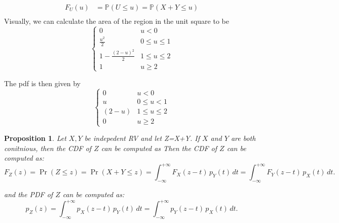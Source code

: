 \documentclass[twoside]{article}
\newtheorem{proposition}[theorem]{Proposition}
\newcommand{\prob}{\mathbb{P}}
\begin{document}
\begin{itemize}
\begin{center}
{%
}%
\end{center}

\begin{align*}
    F_U(u) &= \prob(U\leq u)= \prob(X+Y\leq u)\\
\end{align*}
Visually, we can calculate the area of the region in the unit square to be 
\[
\begin{cases}
    0 & u<0\\
    \frac{u^2}{2} & 0\leq u \leq 1\\
    1-\frac{(2-u)^2}{2} & 1\leq u \leq 2\\
    1 & u\geq 2
\end{cases}
\]

The pdf is then given by
\[
\begin{cases}
    0 & u<0\\
    u & 0\leq u < 1\\
    (2-u) & 1\leq u \leq 2\\
    0 & u\geq 2
\end{cases}
\]
\begin{proposition}
Let $X,Y$ be indepedent RV and let Z=X+Y. If $X$ and $Y$ are both conitnious, then the CDF of $Z$ can be computed as 
Then the CDF of $Z$ can be computed as:
\[
F_Z(z)=\Pr(Z\le z)=\Pr(X+Y\le z)
= \int_{-\infty}^{+\infty} F_X(z-t)\,p_Y(t)\,dt
= \int_{-\infty}^{+\infty} F_Y(z-t)\,p_X(t)\,dt .
\]

and the PDF of $Z$ can be computed as:
\[
p_Z(z)=\int_{-\infty}^{+\infty} p_X(z-t)\,p_Y(t)\,dt
= \int_{-\infty}^{+\infty} p_Y(z-t)\,p_X(t)\,dt .
\]


\end{proposition}
\end{itemize}
\end{document}
